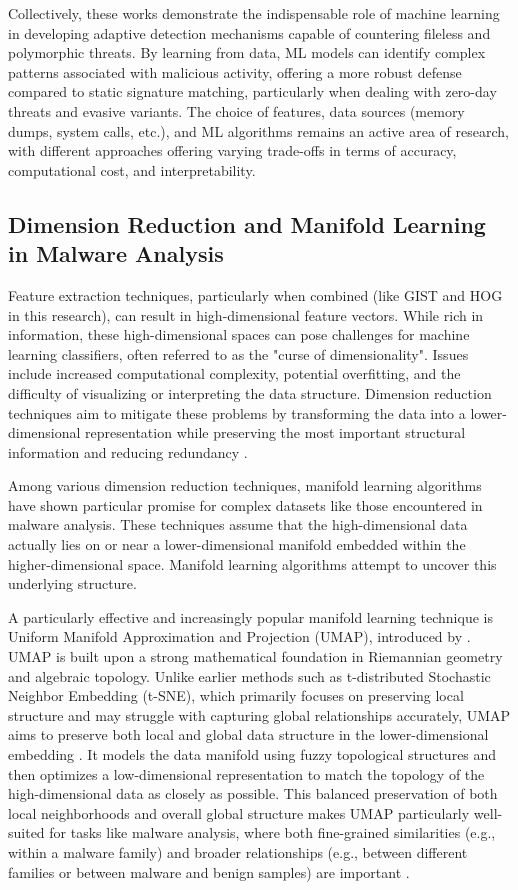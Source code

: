 Collectively, these works demonstrate the indispensable role of machine learning in developing adaptive detection mechanisms capable of countering fileless and polymorphic threats. By learning from data, ML models can identify complex patterns associated with malicious activity, offering a more robust defense compared to static signature matching, particularly when dealing with zero-day threats and evasive variants. The choice of features, data sources (memory dumps, system calls, etc.), and ML algorithms remains an active area of research, with different approaches offering varying trade-offs in terms of accuracy, computational cost, and interpretability.

\subsection{Dimension Reduction and Manifold Learning in Malware Analysis}
\label{subsec:dim_reduction}

Feature extraction techniques, particularly when combined (like GIST and HOG in this research), can result in high-dimensional feature vectors. While rich in information, these high-dimensional spaces can pose challenges for machine learning classifiers, often referred to as the "curse of dimensionality". Issues include increased computational complexity, potential overfitting, and the difficulty of visualizing or interpreting the data structure. Dimension reduction techniques aim to mitigate these problems by transforming the data into a lower-dimensional representation while preserving the most important structural information and reducing redundancy \cite{mcinnes2018umap}.

Among various dimension reduction techniques, manifold learning algorithms have shown particular promise for complex datasets like those encountered in malware analysis. These techniques assume that the high-dimensional data actually lies on or near a lower-dimensional manifold embedded within the higher-dimensional space. Manifold learning algorithms attempt to uncover this underlying structure.

A particularly effective and increasingly popular manifold learning technique is Uniform Manifold Approximation and Projection (UMAP), introduced by \citet{mcinnes2018umap}. UMAP is built upon a strong mathematical foundation in Riemannian geometry and algebraic topology. Unlike earlier methods such as t-distributed Stochastic Neighbor Embedding (t-SNE), which primarily focuses on preserving local structure and may struggle with capturing global relationships accurately, UMAP aims to preserve both local and global data structure in the lower-dimensional embedding \cite{mcinnes2018umap, becht2019dimensionality}. It models the data manifold using fuzzy topological structures and then optimizes a low-dimensional representation to match the topology of the high-dimensional data as closely as possible. This balanced preservation of both local neighborhoods and overall global structure makes UMAP particularly well-suited for tasks like malware analysis, where both fine-grained similarities (e.g., within a malware family) and broader relationships (e.g., between different families or between malware and benign samples) are important \cite{ali2019timeCluster}.

